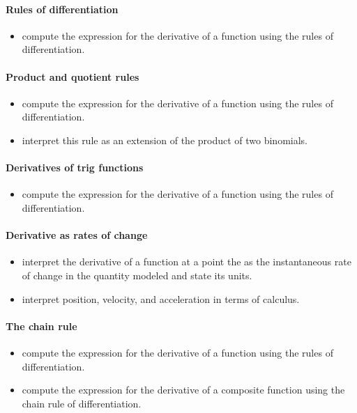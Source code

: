\documentclass{amsart}
\begin{document}
\paragraph*{Rules of differentiation}
\begin{itemize}
\item compute the expression for the derivative of a function using
  the rules of differentiation.
\end{itemize}

\paragraph*{Product and quotient rules}
\begin{itemize}
\item compute the expression for the derivative of a function using
  the rules of differentiation.
\item interpret this rule as an extension of the product of two
  binomials.
\end{itemize}

\paragraph*{Derivatives of trig functions}
\begin{itemize}
\item compute the expression for the derivative of a function using
  the rules of differentiation.
\end{itemize}

\paragraph*{Derivative as rates of change}
\begin{itemize}
\item interpret the derivative of a function at a point the as the
  instantaneous rate of change in the quantity modeled and state its
  units.
\item interpret position, velocity, and acceleration in terms of
  calculus.
\end{itemize}

\paragraph*{The chain rule}
\begin{itemize}
\item compute the expression for the derivative of a function using the rules of differentiation.
\item compute the expression for the derivative of a composite
  function using the chain rule of differentiation.
\end{itemize}
\end{document}
